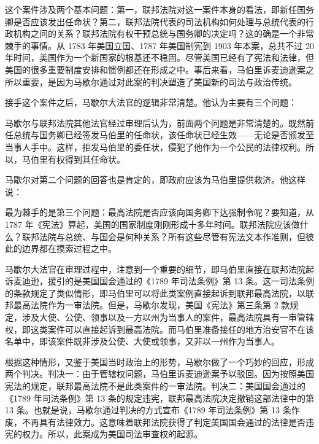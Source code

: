 这个案件涉及两个基本问题：第一，联邦法院对这一案件本身的看法，即新任国务卿是否应该发出任命状？第二，联邦法院代表的司法机构如何处理与总统代表的行政机构之间的关系？联邦法院有权干预总统与国务卿的决定吗？这的确是一个非常棘手的事情。从 1783 年美国立国、1787 年美国制宪到 1903 年本案，总共不过 20 年时间，美国作为一个新国家的根基还不稳固。尽管美国已经有了宪法和法律，但美国的很多重要制度安排和惯例都还在形成之中。事后来看，马伯里诉麦迪逊案之所以重要，是因为马歇尔通过对此案的判决塑造了美国新的司法与政治传统。

接手这个案件之后，马歇尔大法官的逻辑非常清楚。他认为主要有三个问题：


马歇尔与联邦法院其他法官经过审理后认为，前面两个问题是非常清楚的。既然前任总统与国务卿已经签发马伯里的任命状，该任命状已经生效——无论是否颁发至当事人手中。这样，拒发马伯里的委任状，侵犯了他作为一个公民的法律权利。所以，马伯里有权得到其任命状。

马歇尔对第二个问题的回答也是肯定的，即政府应该为马伯里提供救济。他这样说：


最为棘手的是第三个问题：最高法院是否应该向国务卿下达强制令呢？要知道，从 1787 年《宪法》算起，美国的国家制度刚刚形成十多年时间。联邦法院应该做什么？联邦法院与总统、与国会是何种关系？所有这些尽管有宪法文本作准则，但彼此的边界都在摸索过程之中。

马歇尔大法官在审理过程中，注意到一个重要的细节，即马伯里直接在联邦法院起诉麦迪逊，援引的是美国国会通过的《1789 年司法条例》第 13 条。这一司法条例的条款规定了类似情形，即马伯里可以将此类案例直接起诉到联邦最高法院，以联邦最高法院作为一审法院。但是，马歇尔发现，美国《宪法》第三条第 2 款规定，涉及大使、公使、领事以及一方以州为当事人的案件，最高法院具有一审管辖权，即这类案件可以直接起诉到最高法院。而马伯里准备接任的地方治安官不在该名单中，即该案件既非涉及公使、大使或领事，又非以一州作为当事人。

根据这种情形，又鉴于美国当时政治上的形势，马歇尔做了一个巧妙的回应，形成两个判决。判决一：由于管辖权问题，马伯里诉麦迪逊案予以驳回。因为按照美国宪法的规定，联邦最高法院不是此类案件的一审法院。判决二：美国国会通过的《1789 年司法条例》第 13 条的规定违宪，联邦最高法院决定撤销这部法律中的第 13 条。也就是说，马歇尔通过判决的方式宣布《1789 年司法条例》第 13 条作废，不再具有法律效力。这意味着联邦法院获得了判定美国国会通过的法律是否违宪的权力。所以，此案成为美国司法审查权的起源。

